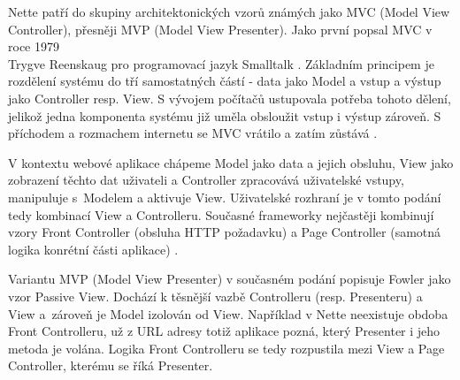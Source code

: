 Nette patří do skupiny architektonických vzorů známých jako MVC (Model View Controller), přesněji MVP (Model View Presenter). Jako první popsal MVC v roce 1979\\ Trygve Reenskaug pro programovací jazyk Smalltalk \cite{FowlerMVC}. Základním principem je rozdělení systému do tří samostatných částí - data jako Model a vstup a výstup jako Controller resp. View. S vývojem počítačů ustupovala potřeba tohoto dělení, jelikož jedna komponenta systému již uměla obsloužit vstup i výstup zároveň. S příchodem a rozmachem internetu se MVC vrátilo a zatím zůstává \cite{zdrojakMVC}.

V kontextu webové aplikace chápeme Model jako data a jejich obsluhu, View jako zobrazení těchto dat uživateli a Controller zpracovává uživatelské vstupy, manipuluje s~Modelem a aktivuje View. Uživatelské rozhraní je v tomto podání tedy kombinací View a Controlleru. Současné frameworky nejčastěji kombinují vzory Front Controller (obsluha HTTP požadavku) a Page Controller (samotná logika konrétní části aplikace) \cite{FowlerMVC}.

Variantu MVP (Model View Presenter) v současném podání popisuje Fowler\cite{FowlerPassiveView} jako vzor Passive View. Dochází k těsnější vazbě Controlleru (resp. Presenteru) a View a~zároveň je Model izolován od View. Například v Nette neexistuje obdoba Front Controlleru, už z URL adresy totiž aplikace pozná, který Presenter i jeho metoda je volána. Logika Front Controlleru se tedy rozpustila mezi View a Page Controller, kterému se říká Presenter.